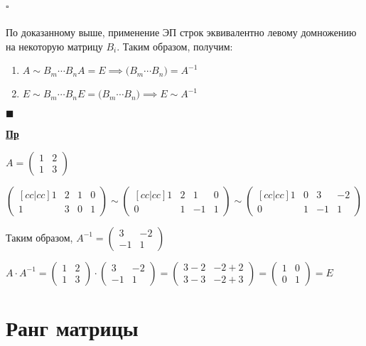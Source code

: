 \documentclass[12pt, a4paper]{report}
\newcommand{\ex}{\begin{flushleft}\textbf{\underline{Пр}}\end{flushleft}}
\newenvironment{proof}{\paragraph{\(\square\)}}{\hfill\(\blacksquare\)}
\begin{document}
	\begin{proof} По доказанному выше, применение ЭП строк эквивалентно левому домножению на некоторую матрицу \(B_{i}\). Таким образом, получим:
	
	\begin{enumerate}[{4.}1)]
		\item \(A\sim B_{m}\dotsb B_{n}A=E\implies \big(B_{m}\dotsb B_{n}\big) = A^{-1}\)
		\item \(E\sim B_{m}\dotsb B_{n}E = \big(B_{m}\dotsb B_{n}\big)\implies E\sim A^{-1}\)
	\end{enumerate}\end{proof}
	\ex
	
	\(A=\begin{pmatrix}1&2\\1&3\end{pmatrix}\)
	\medskip
	
	\(\begin{pmatrix}[cc|cc]1&2&1&0\\1&3&0&1\end{pmatrix}\sim\begin{pmatrix}[cc|cc]1&2&1&0\\0&1&-1&1\end{pmatrix}\sim\begin{pmatrix}[cc|cc]1&0&3&-2\\0&1&-1&1\end{pmatrix}\)
	
	\bigskip Таким образом, \(A^{-1}=\begin{pmatrix}3&-2\\-1&1\end{pmatrix}\)
	
	\bigskip\(A\cdot A^{-1}=\begin{pmatrix}1&2\\1&3\end{pmatrix}\cdot\begin{pmatrix}3&-2\\-1&1\end{pmatrix}=\begin{pmatrix}3-2&-2+2\\3-3&-2+3\end{pmatrix}=\begin{pmatrix}1&0\\0&1\end{pmatrix}=E\)
	
	\chapter{Ранг матрицы}
\end{document}
